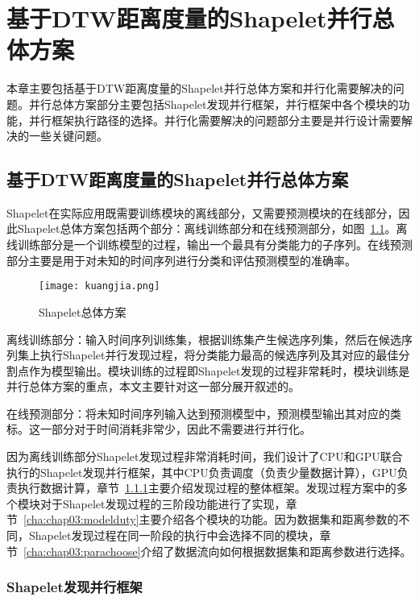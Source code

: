 \chapter{基于DTW距离度量的Shapelet并行总体方案}
\label{cha:chap03}

本章主要包括基于DTW距离度量的Shapelet并行总体方案和并行化需要解决的问题。并行总体方案部分主要包括Shapelet发现并行框架，并行框架中各个模块的功能，并行框架执行路径的选择。并行化需要解决的问题部分主要是并行设计需要解决的一些关键问题。

\section{基于DTW距离度量的Shapelet并行总体方案}
\label{cha:chap04:myalg:Overview}

Shapelet在实际应用既需要训练模块的离线部分，又需要预测模块的在线部分，因此Shapelet总体方案包括两个部分：离线训练部分和在线预测部分，如图~\ref{fig:kuangjia}。离线训练部分是一个训练模型的过程，输出一个最具有分类能力的子序列。在线预测部分主要是用于对未知的时间序列进行分类和评估预测模型的准确率。
\begin{figure}[H] %
	\centering
	\texttt{[image: kuangjia.png]}
	\caption{Shapelet总体方案}
	\label{fig:kuangjia}
\end{figure}

离线训练部分：输入时间序列训练集，根据训练集产生候选序列集，然后在候选序列集上执行Shapelet并行发现过程，将分类能力最高的候选序列及其对应的最佳分割点作为模型输出。模块训练的过程即Shapelet发现的过程非常耗时，模块训练是并行总体方案的重点，本文主要针对这一部分展开叙述的。

在线预测部分：将未知时间序列输入达到预测模型中，预测模型输出其对应的类标。这一部分对于时间消耗非常少，因此不需要进行并行化。

因为离线训练部分Shapelet发现过程非常消耗时间，我们设计了CPU和GPU联合执行的Shapelet发现并行框架，其中CPU负责调度（负责少量数据计算），GPU负责执行数据计算，章节~\ref{cha:chap04:myalg:Overview:overallScheme}主要介绍发现过程的整体框架。发现过程方案中的多个模块对于Shapelet发现过程的三阶段功能进行了实现，章节~\ref{cha:chap03:modelduty}主要介绍各个模块的功能。因为数据集和距离参数的不同，Shapelet发现过程在同一阶段的执行中会选择不同的模块，章节~\ref{cha:chap03:parachoose}介绍了数据流向如何根据数据集和距离参数进行选择。

\subsection{Shapelet发现并行框架}
\label{cha:chap04:myalg:Overview:overallScheme}

